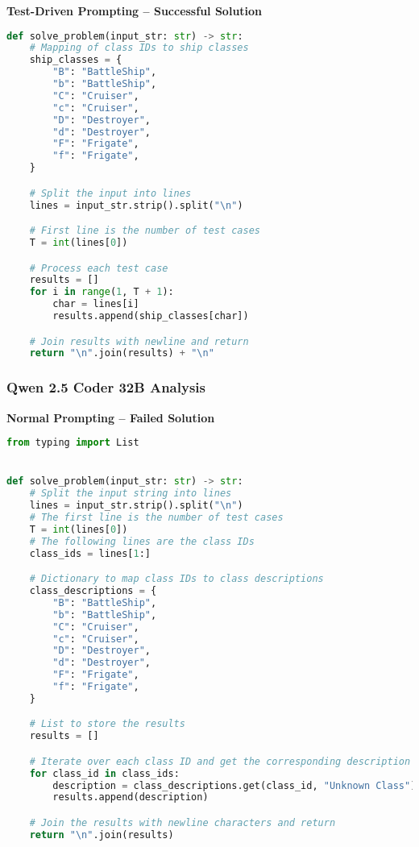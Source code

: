 \documentclass{article}
\begin{document}
\textbf{Test-Driven Prompting -- Successful Solution}
\begin{lstlisting}[language=python]
def solve_problem(input_str: str) -> str:
    # Mapping of class IDs to ship classes
    ship_classes = {
        "B": "BattleShip",
        "b": "BattleShip",
        "C": "Cruiser",
        "c": "Cruiser",
        "D": "Destroyer",
        "d": "Destroyer",
        "F": "Frigate",
        "f": "Frigate",
    }

    # Split the input into lines
    lines = input_str.strip().split("\n")

    # First line is the number of test cases
    T = int(lines[0])

    # Process each test case
    results = []
    for i in range(1, T + 1):
        char = lines[i]
        results.append(ship_classes[char])

    # Join results with newline and return
    return "\n".join(results) + "\n"
\end{lstlisting}

\subsubsection{Qwen 2.5 Coder 32B Analysis}

\textbf{Normal Prompting -- Failed Solution}
\begin{lstlisting}[language=python]
from typing import List


def solve_problem(input_str: str) -> str:
    # Split the input string into lines
    lines = input_str.strip().split("\n")
    # The first line is the number of test cases
    T = int(lines[0])
    # The following lines are the class IDs
    class_ids = lines[1:]

    # Dictionary to map class IDs to class descriptions
    class_descriptions = {
        "B": "BattleShip",
        "b": "BattleShip",
        "C": "Cruiser",
        "c": "Cruiser",
        "D": "Destroyer",
        "d": "Destroyer",
        "F": "Frigate",
        "f": "Frigate",
    }

    # List to store the results
    results = []

    # Iterate over each class ID and get the corresponding description
    for class_id in class_ids:
        description = class_descriptions.get(class_id, "Unknown Class")
        results.append(description)

    # Join the results with newline characters and return
    return "\n".join(results)

\end{lstlisting}
\end{document}
